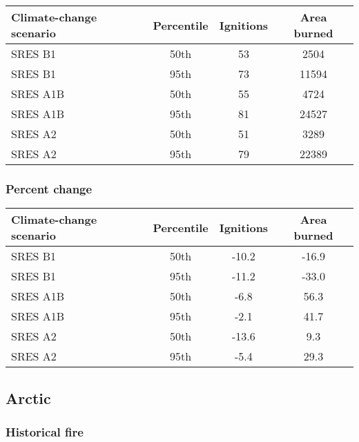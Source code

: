 \documentclass{article}\usepackage[]{graphicx}\usepackage[]{color}
\newcommand{\headcol}{\rowcolor{tableheadcolor}}
\begin{document}
\begin{table}[ht]
\centering
\begin{tabular}{lccc}
  \headcol 
 \toprule
Climate-change scenario & Percentile & Ignitions & Area burned \\ 
  \midrule
SRES B1 & 50th & 53 & 2504 \\ 
  SRES B1 & 95th & 73 & 11594 \\ 
  SRES A1B & 50th & 55 & 4724 \\ 
  SRES A1B & 95th & 81 & 24527 \\ 
  SRES A2 & 50th & 51 & 3289 \\ 
  SRES A2 & 95th & 79 & 22389 \\ 
   \bottomrule
\end{tabular}
\end{table}


\subsubsection{Percent change}

\begin{table}[ht]
\centering
\begin{tabular}{lccc}
  \headcol 
 \toprule
Climate-change scenario & Percentile & Ignitions & Area burned \\ 
  \midrule
SRES B1 & 50th & -10.2 & -16.9 \\ 
  SRES B1 & 95th & -11.2 & -33.0 \\ 
  SRES A1B & 50th & -6.8 & 56.3 \\ 
  SRES A1B & 95th & -2.1 & 41.7 \\ 
  SRES A2 & 50th & -13.6 & 9.3 \\ 
  SRES A2 & 95th & -5.4 & 29.3 \\ 
   \bottomrule
\end{tabular}
\end{table}


\newpage
\pagebreak
\subsection{Arctic}
\subsubsection{Historical fire}
\end{document}
